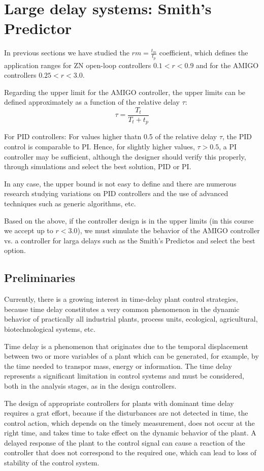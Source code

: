 \section{Large delay systems: Smith's Predictor}

In previous sections we have studied the $rm= \frac{t_m}{t_p}$ coefficient, which defines the application ranges for ZN open-loop controllers $0.1 < r < 0.9$ and for the AMIGO controllers $0.25 < r < 3.0$.

Regarding the upper limit for the AMIGO controller, the upper limits can be defined approximately as a function of the relative delay $\tau$:
\[ \tau = \frac{T_t}{T_t + t_p} \]

For PID controllers: For values higher thatn 0.5 of the relative delay $\tau$, the PID control is comparable to PI. Hence, for slightly higher values, $\tau > 0.5$, a PI controller may be sufficient, although the designer should verify this properly, through simulations and select the best solution, PID or PI.

In any case, the upper bound is not easy to define and there are numerous research studying variations on PID controllers and the use of advanced techniques such as generic algorithms, etc.

Based on the above, if the controller design is in the upper limits (in this course we accept up to $r < 3.0$), we must simulate the behavior of the AMIGO controller vs. a controller for larga delays such as the Smith's Predictos and select the best option.

\subsection{Preliminaries}
Currently, there is a growing interest in time-delay plant control strategies, because time delay constitutes a very common phenomenon in the dynamic behavior of practically all industrial plants, process units, ecological, agricultural, biotechnological systems, etc.

Time delay is a phenomenon that originates due to the temporal displacement between two or more variables of a plant which can be generated, for example, by the time needed to transpor mass, energy or information. The time delay represents a significant limitation in control systems and must be considered, both in the analysis stages, as in the design controllers.

The design of appropriate controllers for plants with dominant time delay requires a grat effort, because if the disturbances are not detected in time, the control action, which depends on the timely measurement, does not occur at the right time, and takes time to take effect on the dynamic behavior of the plant. A delayed response of the plant to the control signal can cause a reaction of the controller that does not correspond to the required one, which can lead to loss of stability of the control system.

